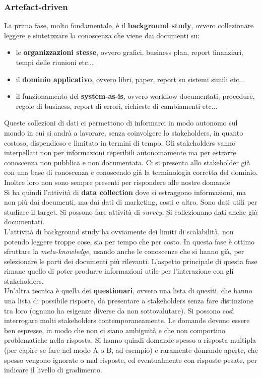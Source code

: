 \subsubsection{Artefact-driven}
La prima fase, molto fondamentale, è il \textbf{background study}, ovvero collezionare leggere e sintetizzare la conoscenza che viene dai documenti su:
\begin{itemize}
  \item le \textbf{organizzazioni stesse}, ovvero grafici, business plan, report finanziari, tempi delle riunioni etc$\ldots$
  \item il \textbf{dominio applicativo}, ovvero libri, paper, report su sistemi simili etc$\ldots$
  \item il funzionamento del \textbf{system-as-is}, ovvero workflow documentati, procedure, regole di business, report di errori, richieste di cambiamenti etc$\ldots$
\end{itemize}
Queste collezioni di dati ci permettono di informarci in modo autonomo sul mondo in cui si andrà a lavorare, senza coinvolgere lo stakeholders, in quanto costoso, dispendioso e limitato in termini di tempo. Gli stakeholders vanno interpellati non per informazioni reperibili autonomamente ma per estrarre conoscenza non pubblica e non documentata. Ci si presenta allo stakeholder già con una base di conoscenza e conoscendo già la terminologia corretta del dominio. Inoltre loro non sono sempre presenti per rispondere alle nostre domande\\
Si ha quindi l'attività di \textbf{data collection} dove si estraggono informazioni, ma non più dai documenti, ma dai dati di marketing, costi e altro. Sono dati utili per studiare il target. Si possono fare attività di \textit{survey}. Si collezionano dati anche già documentati.\\

L'attività di background study ha ovviamente dei limiti di scalabilità, non potendo leggere troppe cose, sia per tempo che per costo. In questa fase è ottimo sfruttare la \textit{meta-knowledge}, usando anche le conoscenze che si hanno già,  per selezionare le parti dei documenti più rilevanti. L'aspetto principale di questa fase rimane quello di poter produrre informazioni utile per l'interazione con gli stakeholders.\\ 

Un'altra tecnica è quella dei \textbf{questionari}, ovvero una lista di quesiti, che hanno una lista di possibile risposte,  da presentare a stakeholders senza fare distinzione tra loro (ognuno ha esigenze diverse da non sottovalutare). Si possono così interrogare molti stakeholders contemporaneamente. Le domande devono essere ben espresse, in modo che non ci siano ambiguità e che non comportino problematiche nella risposta. Si hanno quindi domande spesso a risposta multipla (per capire se fare nel modo A o B, ad esempio) e raramente domande aperte, che spesso vengono ignorate o mal risposte, ed eventualmente con risposte pesate, per indicare il livello di gradimento.\\

